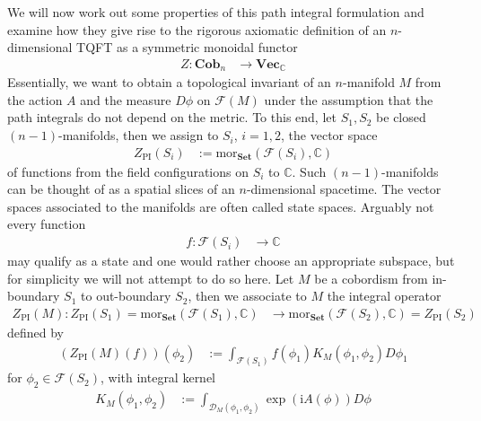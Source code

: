 We will now work out some properties of this path integral formulation and examine how they give rise to the rigorous axiomatic definition of an $n$-dimensional TQFT as a symmetric monoidal functor
\begin{align*}
  Z
  \colon
  \mathbf{Cob}_{n}
  &\to
  \mathbf{Vec}_{\mathbb{C}}
\end{align*}
Essentially, we want to obtain a topological invariant of an $n$-manifold $M$ from the action $A$ and the measure $D\phi$ on $\mathcal{F}(M)$ under the assumption that the path integrals do not depend on the metric. To this end, let $S_{1},S_{2}$ be closed $(n-1)$-manifolds, then we assign to $S_{i}$, $i = 1,2$, the vector space 
\begin{align*}
  Z_{\mathrm{PI}}(S_{i})
  &:=
  \mathrm{mor}_{\mathbf{Set}}
  \left(
    \mathcal{F}(S_{i})
    ,
    \mathbb{C}
  \right)
\end{align*}
of functions from the field configurations on $S_{i}$ to $\mathbb{C}$. Such $(n-1)$-manifolds can be thought of as a spatial slices of an $n$-dimensional spacetime. The vector spaces associated to the manifolds are often called state spaces. Arguably not every function
\begin{align*}
  f
  \colon
  \mathcal{F}(S_{i})
  &\to
  \mathbb{C}
\end{align*}
may qualify as a state and one would rather choose an appropriate subspace, but for simplicity we will not attempt to do so here. Let $M$ be a cobordism from in-boundary $S_{1}$ to out-boundary $S_{2}$, then we associate to $M$ the integral operator
\begin{align*}
  Z_{\mathrm{PI}}(M)
  \colon
  Z_{\mathrm{PI}}(S_{1})
  =
  \mathrm{mor}_{\mathbf{Set}}
  \left(
    \mathcal{F}(S_{1})
    ,
    \mathbb{C}
  \right)
  &\to
  \mathrm{mor}_{\mathbf{Set}}
  \left(
    \mathcal{F}(S_{2})
    ,
    \mathbb{C}
  \right)
  =
  Z_{\mathrm{PI}}(S_{2})
\end{align*}
defined by
\begin{align*}
  \left(
    Z_{\mathrm{PI}}(M)(f)
  \right)
  (\phi_{2})
  &:=
  \int_{\mathcal{F}(S_{1})}
  f(\phi_{1})
  K_{M}
  \left(
    \phi_{1}
    ,
    \phi_{2}
  \right)
  D\phi_{1}
\end{align*}
for $\phi_{2} \in \mathcal{F}(S_{2})$, with integral kernel
\begin{align*}
  K_{M}
  \left(
    \phi_{1}
    ,
    \phi_{2}
  \right)
  &:=
  \int_{\mathcal{D}_{M}(\phi_{1},\phi_{2})}
  \exp(\mathrm{i}A(\phi))
  D\phi
\end{align*}
